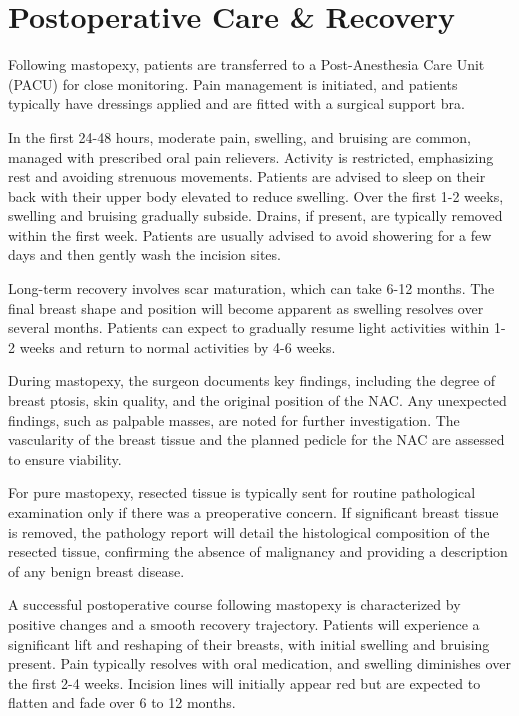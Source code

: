 \section*{Postoperative Care \& Recovery}
Following mastopexy, patients are transferred to a Post-Anesthesia Care Unit (PACU) for close monitoring. Pain management is initiated, and patients typically have dressings applied and are fitted with a surgical support bra.

In the first 24-48 hours, moderate pain, swelling, and bruising are common, managed with prescribed oral pain relievers. Activity is restricted, emphasizing rest and avoiding strenuous movements. Patients are advised to sleep on their back with their upper body elevated to reduce swelling. Over the first 1-2 weeks, swelling and bruising gradually subside. Drains, if present, are typically removed within the first week. Patients are usually advised to avoid showering for a few days and then gently wash the incision sites.

Long-term recovery involves scar maturation, which can take 6-12 months. The final breast shape and position will become apparent as swelling resolves over several months. Patients can expect to gradually resume light activities within 1-2 weeks and return to normal activities by 4-6 weeks.

During mastopexy, the surgeon documents key findings, including the degree of breast ptosis, skin quality, and the original position of the NAC. Any unexpected findings, such as palpable masses, are noted for further investigation. The vascularity of the breast tissue and the planned pedicle for the NAC are assessed to ensure viability.

For pure mastopexy, resected tissue is typically sent for routine pathological examination only if there was a preoperative concern. If significant breast tissue is removed, the pathology report will detail the histological composition of the resected tissue, confirming the absence of malignancy and providing a description of any benign breast disease.

A successful postoperative course following mastopexy is characterized by positive changes and a smooth recovery trajectory. Patients will experience a significant lift and reshaping of their breasts, with initial swelling and bruising present. Pain typically resolves with oral medication, and swelling diminishes over the first 2-4 weeks. Incision lines will initially appear red but are expected to flatten and fade over 6 to 12 months.

